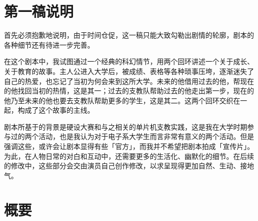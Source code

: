 \documentclass[10pt,a5paper,oneside]{memoir}
\begin{document}
\chapter*{第一稿说明}

首先必须抱歉地说明，由于时间仓促，这一稿只能大致勾勒出剧情的轮廓，剧本的各种细节还有待进一步完善。

在这个剧本中，我试图通过一个经典的科幻情节，用两个回环讲述一个关于成长、关于教育的故事。主人公进入大学后，被成绩、表格等各种琐事压垮，逐渐迷失了自己的热爱，也忘记了当初为何会来到这所大学。未来的他借用过去的他，帮现在的他找回当初的热情，这是其一；过去的支教队帮助过去的他走出第一步，现在的他乃至未来的他也要去支教队帮助更多的学生，这是其二。这两个回环交织在一起，构成了这个故事的主线。

剧本所基于的背景是硬设大赛和与之相关的单片机支教实践，这是我在大学时期参与过的两个活动，也是我认为对于电子系大学生而言非常有意义的两个活动。但是强调这些，或许会让剧本显得有些「官方」，而我并不希望把剧本拍成「宣传片」。为此，在人物日常的对白和互动中，还需要更多的生活化、幽默化的细节。在后续的修改中，这些部分会交由演员自己创作修改，以求呈现得更加自然、生动、接地气。





\clearpage
{}

\chapter*{概要}
\end{document}
